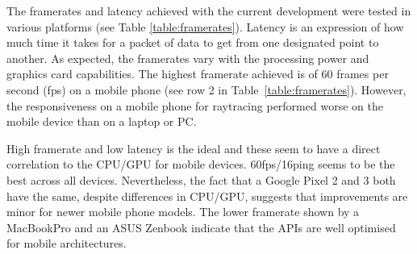\documentclass[acmlarge,screen,dvipsnames]{acmart}
\begin{document}

The framerates and latency achieved with the current development were tested
in various platforms (see Table \ref{table:framerates}). Latency is an
expression of how much time it takes for a packet of data to get from one
designated point to another. As expected, the framerates vary with the
processing power and graphics card capabilities. The highest framerate
achieved is of 60 frames per second (fps) on a mobile phone (see row 2 in
Table~\ref{table:framerates}). However, the responsiveness on a mobile phone for
raytracing performed worse on the mobile device than on a laptop or PC.

High framerate and low latency is the ideal and these seem to have a direct
correlation to the CPU/GPU for mobile devices. 60fps/16ping seems to be the
best across all devices. Nevertheless, the fact that a Google Pixel 2 and 3 both
have the same, despite differences in CPU/GPU, suggests that improvements are minor
for newer mobile phone models. The lower framerate shown by a MacBookPro
and an ASUS Zenbook indicate that the APIs are well optimised for mobile
architectures.

\end{document}
